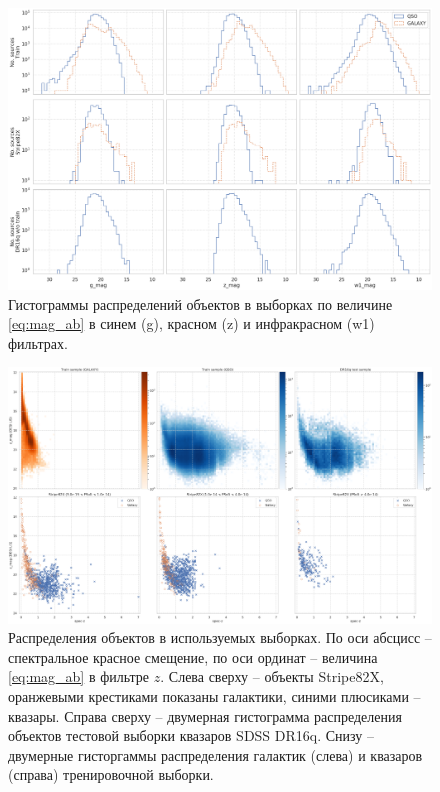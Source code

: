 \documentclass[fleqn,usenatbib]{mnras}
\begin{document}
\begin{figure}
    \centering
    \includegraphics[width=0.9\linewidth]{images/data-dist-mags-ab.png}
    \caption{Гистограммы распределений объектов в выборках по величине \eqref{eq:mag_ab} в синем (g), красном (z) и инфракрасном (w1) фильтрах.}
    \label{fig:my_label}
\end{figure}

\begin{figure}
    \centering
    \includegraphics[width=0.95\linewidth]{images/data-dist-ab-upsidedown.png}
    \caption{Распределения объектов в используемых выборках. По оси абсцисс -- спектральное красное смещение, по оси ординат -- величина \eqref{eq:mag_ab} в фильтре $z$. Слева сверху -- объекты Stripe82X, оранжевыми крестиками показаны галактики, синими плюсиками -- квазары. Справа сверху -- двумерная гистограмма распределения объектов тестовой выборки квазаров SDSS DR16q. Снизу -- двумерные гисторгаммы распределения галактик (слева) и квазаров (справа) тренировочной выборки.}
    \label{fig:data_distribution}
\end{figure}
\end{document}
